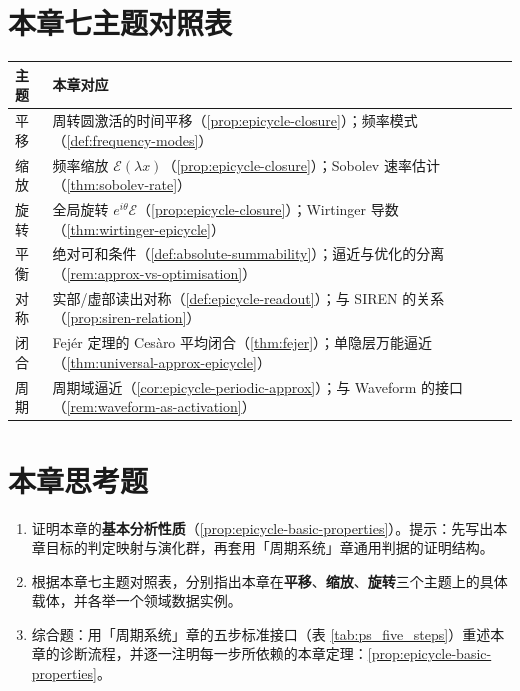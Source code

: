 \section*{本章七主题对照表}

\begin{center}
\renewcommand{\arraystretch}{1.3}
\begin{tabular}{@{}p{2.2cm} p{10.5cm}@{}}
\toprule
主题 & 本章对应 \\
\midrule
平移 & 周转圆激活的时间平移（\cref{prop:epicycle-closure}）；频率模式（\cref{def:frequency-modes}） \\
缩放 & 频率缩放 $\mathcal E(\lambda x)$（\cref{prop:epicycle-closure}）；Sobolev 速率估计（\cref{thm:sobolev-rate}） \\
旋转 & 全局旋转 $e^{i\theta}\mathcal E$（\cref{prop:epicycle-closure}）；Wirtinger 导数（\cref{thm:wirtinger-epicycle}） \\
平衡 & 绝对可和条件（\cref{def:absolute-summability}）；逼近与优化的分离（\cref{rem:approx-vs-optimisation}） \\
对称 & 实部/虚部读出对称（\cref{def:epicycle-readout}）；与 SIREN 的关系（\cref{prop:siren-relation}） \\
闭合 & Fejér 定理的 Cesàro 平均闭合（\cref{thm:fejer}）；单隐层万能逼近（\cref{thm:universal-approx-epicycle}） \\
周期 & 周期域逼近（\cref{cor:epicycle-periodic-approx}）；与 Waveform 的接口（\cref{rem:waveform-as-activation}） \\
\bottomrule
\end{tabular}
\end{center}

\section*{本章思考题}

\begin{enumerate}[leftmargin=3em, label=\textbf{题 \arabic*}]
    \item 证明本章的\textbf{基本分析性质}（\ref{prop:epicycle-basic-properties}）。提示：先写出本章目标的判定映射与演化群，再套用「周期系统」章通用判据的证明结构。

    \item 根据本章七主题对照表，分别指出本章在\textbf{平移}、\textbf{缩放}、\textbf{旋转}三个主题上的具体载体，并各举一个领域数据实例。

    \item 综合题：用「周期系统」章的五步标准接口（表 \ref{tab:ps_five_steps}）重述本章的诊断流程，并逐一注明每一步所依赖的本章定理：\ref{prop:epicycle-basic-properties}。
\end{enumerate}


